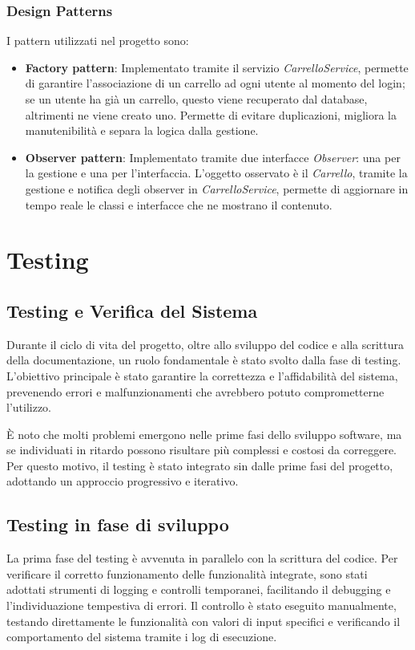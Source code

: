 \documentclass[a4paper,12pt]{article}
\begin{document}
\subsubsection{Design Patterns}

I pattern utilizzati nel progetto sono:
\begin{itemize}
    \item \textbf{Factory pattern}: Implementato tramite il servizio \textit{CarrelloService}, permette di garantire l'associazione di un carrello ad ogni utente al momento del login; se un utente ha già un carrello,  questo viene recuperato dal database, altrimenti ne viene creato uno. Permette di evitare duplicazioni, migliora la manutenibilità e separa la logica dalla gestione.
    \item \textbf{Observer pattern}: Implementato tramite due interfacce \textit{Observer}: una per la gestione e una per l'interfaccia. L'oggetto osservato è il \textit{Carrello}, tramite la gestione e notifica degli observer in \textit{CarrelloService}, permette di aggiornare in tempo reale le classi e interfacce che ne mostrano il contenuto. 
\end{itemize}

\newpage
\section{Testing}
\subsection{Testing e Verifica del Sistema}
Durante il ciclo di vita del progetto, oltre allo sviluppo del codice e alla scrittura della documentazione, un ruolo fondamentale è stato svolto dalla fase di testing. L'obiettivo principale è stato garantire la correttezza e l'affidabilità del sistema, prevenendo errori e malfunzionamenti che avrebbero potuto comprometterne l’utilizzo.

È noto che molti problemi emergono nelle prime fasi dello sviluppo software, ma se individuati in ritardo possono risultare più complessi e costosi da correggere. Per questo motivo, il testing è stato integrato sin dalle prime fasi del progetto, adottando un approccio progressivo e iterativo.

\subsection{Testing in fase di sviluppo}
La prima fase del testing è avvenuta in parallelo con la scrittura del codice. Per verificare il corretto funzionamento delle funzionalità integrate, sono stati adottati strumenti di logging e controlli temporanei, facilitando il debugging e l’individuazione tempestiva di errori. Il controllo è stato eseguito manualmente, testando direttamente le funzionalità con valori di input specifici e verificando il comportamento del sistema tramite i log di esecuzione.
\end{document}
